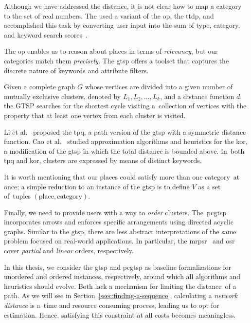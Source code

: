 Although we have addressed the distance, it is not clear how to map a category to the set of real numbers. The \emph{} used a variant of the \acs{op}, the \ac{ttdp}, and accomplished this task by converting user input into the sum of type, category, and keyword search scores~\cite{vansteenwegen11}.

\vspace{0.5em}

The \acs{op} enables us to reason about places in terms of \emph{relevancy}, but our cat\-e\-gories match them \emph{precisely}. The \ac{gtsp} offers a toolset that captures the discrete nature of keywords and attribute filters.

\begin{definition}
Given a complete graph $G$ whose vertices are divided into a given number of mutually exclusive clusters, denoted by $L_{1}, L_{2}, \ldots, L_{k}$, and a distance function $d$, the GTSP searches for the shortest cycle visiting a~collection of vertices with the property that at least one vertex from each cluster is visited.
\end{definition}

Li et al.~\cite{li05} proposed the \ac{tpq}, a path version of the \acs{gtsp} with a symmetric distance function. Cao et al.~\cite{cao12} studied approximation algorithms and heuristics for the \ac{kor}, a modification of the \acs{gtsp} in which the total distance is bounded above. In~both \acs{tpq} and \acs{kor}, clusters are expressed by means of distinct keywords.

It is worth mentioning that our places could satisfy more than one category~at once; a simple reduction to an instance of the \acs{gtsp} is to define $V$ as a set of~tuples $(\text{place}, \text{category})$.

Finally, we need to provide users with a way to \emph{order} clusters. The~\ac{pcgtsp}~\cite{pop23} incorporates arrows and enforces specific arrangements using directed acyclic graphs. Similar to the \acs{gtsp}, there are less abstract interpretations of the same problem focused on real-world applications. In particular, the \ac{mrpsr}~\cite{chen08} and \ac{osr}~\cite{sharifzadeh08} cover \emph{partial} and \emph{linear} orders, respectively.

\vspace{0.5em}

In this thesis, we consider the \acs{gtsp} and \acs{pcgtsp} as baseline formalizations for unordered and ordered instances, respectively, around which all algorithms and heuristics should evolve. Both lack a mechanism for limiting the distance~of a path. As we will see in Section~\ref{ssec:finding-a-sequence}, calculating a \emph{network distance} is a~time and resource consuming process, leading us to opt for estimation. Hence, sat\-is\-fy\-ing this constraint at all costs becomes meaningless.

